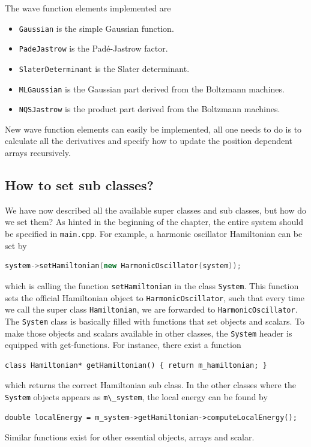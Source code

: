 The wave function elements implemented are 
\begin{itemize}
	\item \lstinline{Gaussian} is the simple Gaussian function.
	\item \lstinline{PadeJastrow} is the Padé-Jastrow factor.
	\item \lstinline{SlaterDeterminant} is the Slater determinant.
	\item \lstinline{MLGaussian} is the Gaussian part derived from the Boltzmann machines.
	\item \lstinline{NQSJastrow} is the product part derived from the Boltzmann machines. 
\end{itemize}

New wave function elements can easily be implemented, all one needs to do is to calculate all the derivatives and specify how to update the position dependent arrays recursively. 

\subsection{How to set sub classes?}
We have now described all the available super classes and sub classes, but how do we set them? As hinted in the beginning of the chapter, the entire system should be specified in \lstinline{main.cpp}. For example, a harmonic oscillator Hamiltonian can be set by
\begin{lstlisting}[language=c++]
system->setHamiltonian(new HarmonicOscillator(system));
\end{lstlisting}
which is calling the function \lstinline{setHamiltonian} in the class \lstinline{System}. This function sets the official Hamiltonian object to \lstinline{HarmonicOscillator}, such that every time we call the super class \lstinline{Hamiltonian}, we are forwarded to \lstinline{HarmonicOscillator}. The \lstinline{System} class is basically filled with functions that set objects and scalars. To make those objects and scalars available in other classes, the \lstinline{System} header is equipped with get-functions. For instance, there exist a function 
\lstset{basicstyle=\scriptsize}
\begin{lstlisting}
class Hamiltonian* getHamiltonian() { return m_hamiltonian; }
\end{lstlisting}
which returns the correct Hamiltonian sub class. In the other classes where the \lstinline{System} objects appears as \lstinline{m\_system}, the local energy can be found by
\lstset{basicstyle=\scriptsize}
\begin{lstlisting}
double localEnergy = m_system->getHamiltonian->computeLocalEnergy();
\end{lstlisting}
Similar functions exist for other essential objects, arrays and scalar. 
\fi

